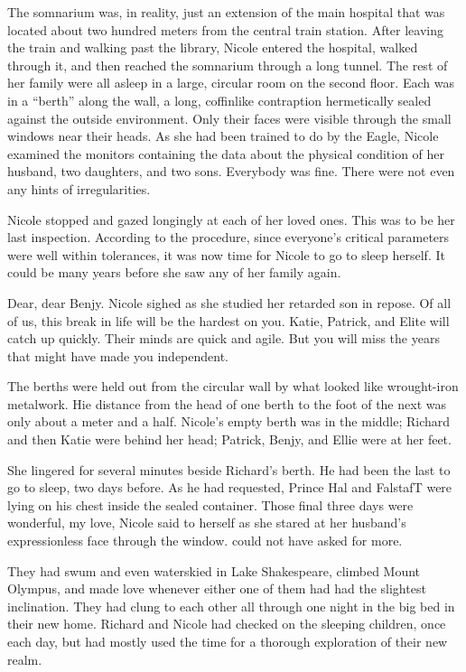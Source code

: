 \documentclass[]{article}
\begin{document}
{The somnarium was, in reality, just an extension of the main hospital that was located about two hundred meters from the central train station.  After leaving the train and walking past the library, Nicole entered the hospital, walked through it, and then reached the somnarium through a long tunnel.  The rest of her family were all asleep in a large, circular room on the second floor.  Each was in a “berth” along the wall, a long, coffinlike contraption hermetically sealed against the outside environment.  Only their faces were visible through the small windows near their heads.  As she had been trained to do by the Eagle, Nicole examined the monitors containing the data about the physical condition of her husband, two daughters, and two sons.  Everybody was fine.  There were not even any hints of irregularities.

Nicole stopped and gazed longingly at each of her loved ones.  This was to be her last inspection.  According to the procedure, since everyone’s critical parameters were well within tolerances, it was now time for Nicole to go to sleep herself.  It could be many years before she saw any of her family again.

Dear, dear Benjy.  Nicole sighed as she studied her retarded son in repose.  Of all of us, this break in life will be the hardest on you.  Katie, Patrick, and Elite will catch up quickly.  Their minds are quick and agile.  But you will miss the years that might have made you independent.

The berths were held out from the circular wall by what looked like wrought-iron metalwork.  Hie distance from the head of one berth to the foot of the next was only about a meter and a half.  Nicole’s empty berth was in the middle; Richard and then Katie were behind her head; Patrick, Benjy, and Ellie were at her feet.

She lingered for several minutes beside Richard’s berth.  He had been the last to go to sleep, two days before.  As he had requested, Prince Hal and FalstafT were lying on his chest inside the sealed container.  Those final three days were wonderful, my love, Nicole said to herself as she stared at her husband’s expressionless face through the window.  could not have asked for more.

They had swum and even waterskied in Lake Shakespeare, climbed Mount Olympus, and made love whenever either one of them had had the slightest inclination.  They had clung to each other all through one night in the big bed in their new home.  Richard and Nicole had checked on the sleeping children, once each day, but had mostly used the time for a thorough exploration of their new realm.

}
\end{document}
